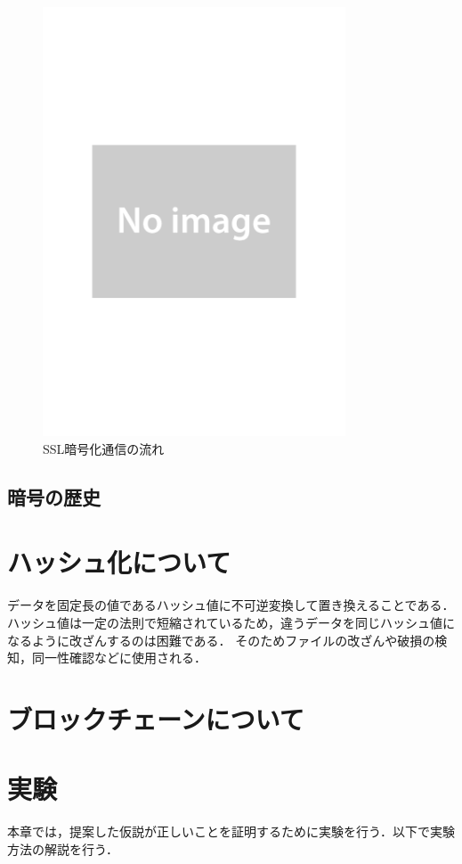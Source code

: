 \documentclass[a4j,12pt]{jsarticle}
\begin{document}
\begin{figure}[H]
\centering
\includegraphics[width=9cm]{noimage.pdf}
\caption{SSL暗号化通信の流れ}
\label{fig:no}
\end{figure} 



\subsection{暗号の歴史}






\newpage
\section{ハッシュ化について}

データを固定長の値であるハッシュ値に不可逆変換して置き換えることである．
ハッシュ値は一定の法則で短縮されているため，違うデータを同じハッシュ値になるように改ざんするのは困難である．
そのためファイルの改ざんや破損の検知，同一性確認などに使用される．

\newpage
\section{ブロックチェーンについて}

\newpage
\section{実験}
本章では，提案した仮説が正しいことを証明するために実験を行う．以下で実験方法の解説を行う．
\end{document}
